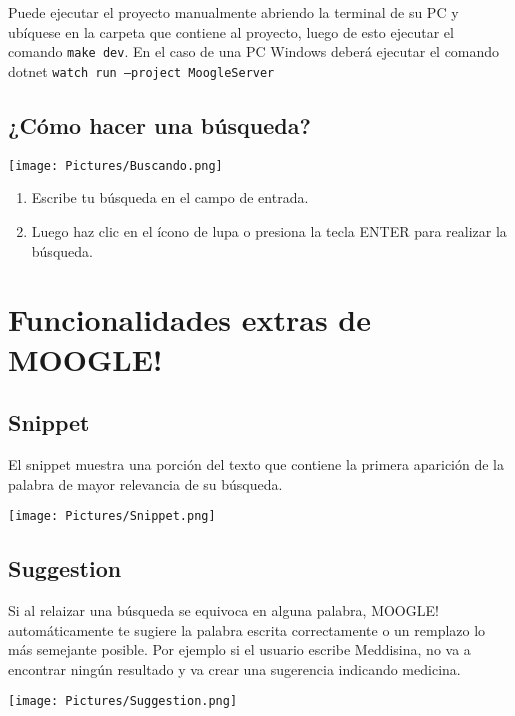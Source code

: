 \documentclass[a4paper,12pt]{article}
\begin{document}
Puede ejecutar el proyecto manualmente abriendo la terminal de su PC y ubíquese en la carpeta que contiene al proyecto, luego de esto ejecutar el comando \texttt{make dev}.
En el caso de una PC Windows deberá ejecutar el comando dotnet \texttt{watch run --project MoogleServer}

\subsection{¿Cómo hacer una búsqueda?}
\begin{center}
    \texttt{[image: Pictures/Buscando.png]}\label{fig:Ejemplo de busqueda}
\end{center}
\begin{enumerate}
    \item Escribe tu búsqueda en el campo de entrada.
    \item Luego haz clic en el ícono de lupa o presiona la tecla ENTER para realizar la búsqueda.
\end{enumerate}
\newpage
\section{Funcionalidades extras de MOOGLE!}\label{sec:functions}

\subsection{Snippet}\label{sub:snippet}
El snippet muestra una porción del texto que contiene la primera aparición de la palabra de mayor
relevancia de su búsqueda.

\begin{center}
    \texttt{[image: Pictures/Snippet.png]}
\end{center}


\subsection{Suggestion}\label{sub:suggestion}
Si al relaizar una búsqueda se equivoca en alguna palabra, MOOGLE! automáticamente te sugiere la palabra escrita correctamente 
o un remplazo lo más semejante posible. Por ejemplo si el usuario escribe Meddisina, no va a encontrar ningún resultado y va crear una sugerencia
indicando medicina.

\begin{center}
    \texttt{[image: Pictures/Suggestion.png]}
\end{center}
\end{document}
